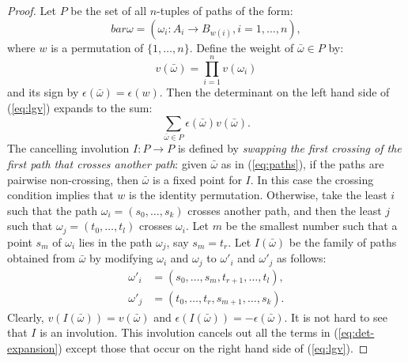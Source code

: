 \documentclass[11pt]{amsproc}
\theoremstyle{definition}
\theoremstyle{example}
\begin{document}
\begin{proof}
  Let $P$ be the set of all $n$-tuples of paths of the form:
  \begin{equation}
    \label{eq:paths}
    bar\omega = (\omega_i:A_i\to B_{w(i)}, i=1,\dotsc, n),
  \end{equation}
  where $w$ is a permutation of $\{1,\dotsc, n\}$.
  Define the weight of $\bar \omega\in P$ by:
  \begin{displaymath}
    v(\bar\omega) = \prod_{i=1}^n v(\omega_i)
  \end{displaymath}
  and its sign by $\epsilon(\bar\omega)=\epsilon(w)$.
  Then the determinant on the left hand side of (\ref{eq:lgv}) expands to the sum:
  \begin{equation}
    \label{eq:det-expansion}
    \sum_{\bar\omega\in P} \epsilon(\bar\omega)v(\bar\omega).
  \end{equation}
  The cancelling involution $I:P\to P$ is defined by \emph{swapping the first crossing of the first path that crosses another path}: given $\bar\omega$ as in (\ref{eq:paths}), if the paths are pairwise non-crossing, then $\bar\omega$ is a fixed point for $I$.
  In this case the crossing condition implies that $w$ is the identity permutation.
  Otherwise, take the least $i$ such that the path $\omega_i=(s_0,\dotsc,s_k)$ crosses another path, and then the least $j$ such that $\omega_j=(t_0,\dotsc,t_l)$ crosses $\omega_i$.
  Let $m$ be the smallest number such that a point $s_m$ of $\omega_i$ lies in the path $\omega_j$, say $s_m=t_r$.
  Let $I(\bar\omega)$ be the family of paths obtained from $\bar\omega$ by modifying $\omega_i$ and $\omega_j$ to $\omega'_i$ and $\omega'_j$ as follows:
  \begin{align*}
    \omega'_i & = (s_0,\dotsc, s_m, t_{r+1}, \dotsc, t_l),\\
    \omega'_j & = (t_0,\dotsc, t_r, s_{m+1}, \dotsc, s_k).
  \end{align*}
  Clearly, $v(I(\bar\omega)) = v(\bar\omega)$ and $\epsilon(I(\bar\omega)) = - \epsilon(\bar\omega)$.
  It is not hard to see that $I$ is an involution.
  This involution cancels out all the terms in (\ref{eq:det-expansion}) except those that occur on the right hand side of (\ref{eq:lgv}).
\end{proof}
\end{document}
